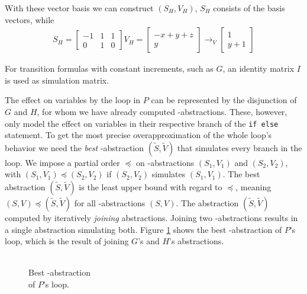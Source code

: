 With these vector basis we can construct $(S_H, V_H)$, $S_H$ consists of the basis \s vectors, while
\begin{align*}
	S_H = \begin{bmatrix} -1 & 1 & 1 \\ 0 & 1 & 0 \end{bmatrix}
	V_H = \begin{bmatrix} - x + y + z \\ y \end{bmatrix} \rightarrow_V \begin{bmatrix}	1 \\ y + 1 \end{bmatrix}
\end{align*}







For transition formulas with constant increments, such as $G$, an identity matrix $I$ is used as simulation matrix. \par
The effect on variables by the loop in $P$ can be represented by the disjunction of $G$ and $H$, for whom we have already computed \qvasr-abstractions. These, however, only model the effect on variables in their respective branch of the \texttt{if else} statement. To get the most precise overapproximation of the whole loop's behavior we need the \textsl{best} \qvasr-abstraction $(\tilde{S}, \tilde{V})$ that simulates every branch in the loop.
We impose a partial order $\preceq$ on \qvasr-abstractions $(S_1, V_1)$ and $(S_2, V_2)$, with $(S_1, V_1) \preceq (S_2, V_2)$ if $(S_2, V_2)$ simulates $(S_1, V_1)$. The best abstraction $(\tilde{S}, \tilde{V})$ is the least upper bound with regard to $\preceq$, meaning $(S, V) \preceq (\tilde{S}, \tilde{V})$ for all \qvasr-abstractions $(S, V)$. The abstraction $(\tilde{S}, \tilde{V})$ computed by iteratively \textsl{joining} abstractions. Joining two \qvasr-abstractions results in a single abstraction simulating both. Figure \ref{vasr} shows the best \qvasr-abstraction of $P$'s loop, which is the result of joining $G$'s and $H$'s abstractions. \\
\begin{minipage}[t]{\textwidth} \centering
	\begin{figure}[H]
		
		\caption{\\ Best \qvasr-abstraction \\ of $P$'s loop.}
		\label{vasr}
	\end{figure}
\end{minipage}

